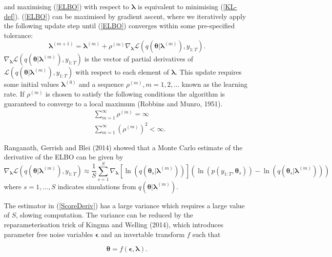 \documentclass[12pt,a4paper]{article}%
\numberwithin{equation}{section}
\begin{document}
and maximising (\ref{ELBO}) with respect to $\boldsymbol{\lambda}$ is equivalent to minimising (\ref{KL-def}). (\ref{ELBO}) can be maximised by gradient ascent, where we iteratively apply the following update step until (\ref{ELBO}) converges within some pre-specified tolerance:
\begin{equation}
\label{GradAscent}
\boldsymbol{\lambda}^{(m+1)} = \boldsymbol{\lambda}^{(m)} + \rho^{(m)} \nabla_{\boldsymbol{\lambda}} \mathcal{L}(q(\boldsymbol{\theta} | \boldsymbol{\lambda}^{(m)}), y_{1:T}).
\end{equation}
$\nabla_{\boldsymbol{\lambda}}\mathcal{L}(q(\boldsymbol{\theta} | \boldsymbol{\lambda}^{(m)}), y_{1:T})$ is the vector of partial derivatives of $\mathcal{L}(q(\boldsymbol{\theta} | \boldsymbol{\lambda}^{(m)}), y_{1:T})$ with respect to each element of $\boldsymbol{\lambda}$. This update requires some initial values $\boldsymbol{\lambda}^{(0)}$ and a sequence $\rho^{(m)}, m = 1, 2, \dots$ known as the learning rate. If $\rho^{(m)}$ is chosen to satisfy the following conditions the algorithm is guaranteed to converge to a local maximum (Robbins and Munro, 1951).
\begin{align}
&\sum_{m=1}^{\infty} \rho^{(m)} =  \infty \\
&\sum_{m=1}^{\infty} (\rho^{(m)})^2 <  \infty.
\end{align}

Ranganath, Gerrish and Blei (2014) showed that a Monte Carlo estimate of the derivative of the ELBO can be given by
\begin{equation}
\label{ScoreDeriv}
\nabla_{\boldsymbol{\lambda}}\mathcal{L}(q(\boldsymbol{\theta} | \boldsymbol{\lambda}^{(m)}), y_{1:T}) \approx \frac{1}{S}\sum_{s=1}^{S} \nabla_{\boldsymbol{\lambda}} [\ln(q(\boldsymbol{\theta}_s | \boldsymbol{\lambda}^{(m)}))] (\ln (p(y_{1:T}, \boldsymbol{\theta}_s)) - \ln(q(\boldsymbol{\theta}_s | \boldsymbol{\lambda}^{(m)})))
\end{equation}
where $s = 1, \dots, S$ indicates simulations from $q(\boldsymbol{\theta} | \boldsymbol{\lambda}^{(m)})$.

The estimator in (\ref{ScoreDeriv}) has a large variance which requires a large value of $S$, slowing computation. The variance can be reduced by the reparameterisation trick of Kingma and Welling (2014), which introduces parameter free noise variables $\boldsymbol{\epsilon}$ and an invertable transform $f$ such that

\begin{equation}
\label{Reparam}
\boldsymbol{\theta} = f(\boldsymbol{\epsilon}, \boldsymbol{\lambda}).
\end{equation}
\end{document}
